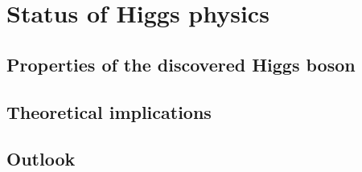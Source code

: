 
\chapter{Status of Higgs physics}
\label{chap:conclusions}

\section{Properties of the discovered Higgs boson}
	\label{sec:searches}
	
\section{Theoretical implications}
	\label{sec:implications}
	
\section{Outlook}
	\label{sec:outlook}
	




